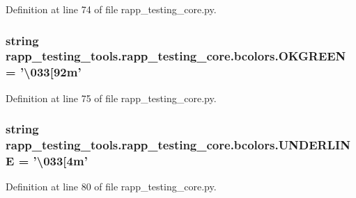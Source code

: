 Definition at line 74 of file rapp\-\_\-testing\-\_\-core.\-py.

\hypertarget{classrapp__testing__tools_1_1rapp__testing__core_1_1bcolors_aaaff3ce6720a04ce7f73c66fce6eaff9}{
\subsubsection[{O\-K\-G\-R\-E\-E\-N}]{\setlength{\rightskip}{0pt plus 5cm}string rapp\-\_\-testing\-\_\-tools.\-rapp\-\_\-testing\-\_\-core.\-bcolors.\-O\-K\-G\-R\-E\-E\-N = '\textbackslash{}033\mbox{[}92m'\hspace{0.3cm}{\ttfamily [static]}}}\label{classrapp__testing__tools_1_1rapp__testing__core_1_1bcolors_aaaff3ce6720a04ce7f73c66fce6eaff9}


Definition at line 75 of file rapp\-\_\-testing\-\_\-core.\-py.

\hypertarget{classrapp__testing__tools_1_1rapp__testing__core_1_1bcolors_aee1dec3a4635461ff95db736fe105149}{
\subsubsection[{U\-N\-D\-E\-R\-L\-I\-N\-E}]{\setlength{\rightskip}{0pt plus 5cm}string rapp\-\_\-testing\-\_\-tools.\-rapp\-\_\-testing\-\_\-core.\-bcolors.\-U\-N\-D\-E\-R\-L\-I\-N\-E = '\textbackslash{}033\mbox{[}4m'\hspace{0.3cm}{\ttfamily [static]}}}\label{classrapp__testing__tools_1_1rapp__testing__core_1_1bcolors_aee1dec3a4635461ff95db736fe105149}


Definition at line 80 of file rapp\-\_\-testing\-\_\-core.\-py.

